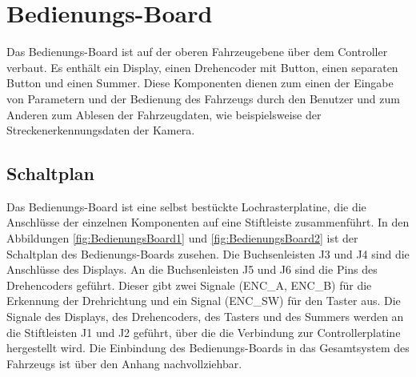 

\pagestyle{fancy}
\rhead{\thepage} \chead{} 
\cfoot{}



\section{Bedienungs-Board}\label{Sec6}

Das Bedienungs-Board ist auf der oberen Fahrzeugebene über dem Controller verbaut. Es enthält ein Display, einen Drehencoder mit Button, einen separaten Button und einen Summer. Diese Komponenten dienen zum einen der Eingabe von Parametern und der Bedienung des Fahrzeugs durch den Benutzer und zum Anderen zum Ablesen der Fahrzeugdaten, wie beispielsweise der Streckenerkennungsdaten der Kamera.

\subsection{Schaltplan}\label{Sec6Sub1}

Das Bedienungs-Board ist eine selbst bestückte Lochrasterplatine, die die Anschlüsse der einzelnen Komponenten auf eine Stiftleiste zusammenführt. In den Abbildungen \ref{fig:BedienungsBoard1} und \ref{fig:BedienungsBoard2} ist der Schaltplan des Bedienungs-Boards zusehen. Die Buchsenleisten J3 und J4 sind die Anschlüsse des Displays. An die Buchsenleisten J5 und J6 sind die Pins des Drehencoders geführt. Dieser gibt zwei Signale (ENC\_A, ENC\_B) für die Erkennung der Drehrichtung und ein Signal (ENC\_SW) für den Taster aus. Die Signale des Displays, des Drehencoders, des Tasters und des Summers werden an die Stiftleisten J1 und J2 geführt, über die die Verbindung zur Controllerplatine hergestellt wird. Die Einbindung des Bedienungs-Boards in das Gesamtsystem des Fahrzeugs ist über den Anhang \glqq{}\grqq{} nachvollziehbar.

